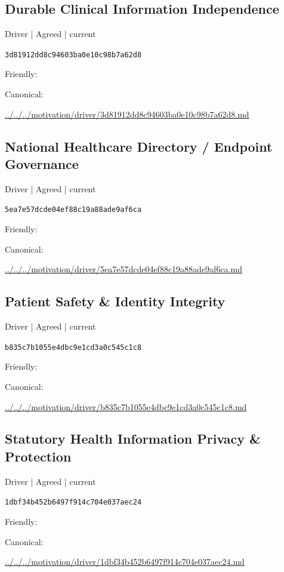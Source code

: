 \documentclass[10pt,a4paper]{article}
\begin{document}
\subsection*{Durable Clinical Information Independence}
{\small Driver | Agreed | current}\par
\texttt{3d81912dd8c94603ba0e10c98b7a62d8}\par
Friendly: \par
Canonical: \par
{\footnotesize\url{../../../motivation/driver/3d81912dd8c94603ba0e10c98b7a62d8.md}}\par
\subsection*{National Healthcare Directory / Endpoint Governance}
{\small Driver | Agreed | current}\par
\texttt{5ea7e57dcde04ef88c19a88ade9af6ca}\par
Friendly: \par
Canonical: \par
{\footnotesize\url{../../../motivation/driver/5ea7e57dcde04ef88c19a88ade9af6ca.md}}\par
\subsection*{Patient Safety \& Identity Integrity}
{\small Driver | Agreed | current}\par
\texttt{b835c7b1055e4dbc9e1cd3a0c545c1c8}\par
Friendly: \par
Canonical: \par
{\footnotesize\url{../../../motivation/driver/b835c7b1055e4dbc9e1cd3a0c545c1c8.md}}\par
\subsection*{Statutory Health Information Privacy \& Protection}
{\small Driver | Agreed | current}\par
\texttt{1dbf34b452b6497f914c704e037aec24}\par
Friendly: \par
Canonical: \par
{\footnotesize\url{../../../motivation/driver/1dbf34b452b6497f914c704e037aec24.md}}\par
\end{document}
